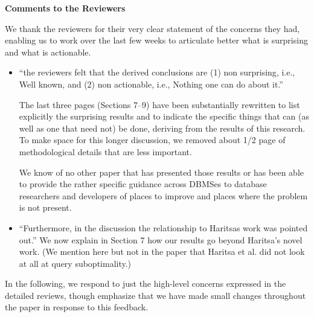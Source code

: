 \documentclass{sig-alternate}
\begin{document}
{\centering\Large\bf Comments to the Reviewers}

We thank the reviewers for their very clear statement of the concerns they
had, enabling us to work over the last few weeks to articulate better what is
surprising and what is actionable.

\vspace{2ex}

\begin{itemize}
\item ``the reviewers felt that the derived conclusions are (1) non
  surprising, i.e., Well known, and (2) non actionable, i.e., Nothing one
  can do about it.''

The last three pages (Sections 7--9) have been substantially rewritten to list explicitly the
surprising results and to indicate the specific things that can (as well as
one that need not) be done, deriving from the results of this research. To
make space for this longer discussion, we removed about 1/2 page of
methodological details that are less important.

We know of no other paper that has presented those results or has been able
to provide the rather specific guidance across DBMSes to database
researchers and developers of places to improve and places where the problem
is not present.

\item ``Furthermore, in the discussion the relationship to Haritsas work was
  pointed out.''
We now explain in Section 7 how our results go beyond Haritsa's novel work. (We
mention here but not in the paper that Haritsa et al. did not look at all at
query suboptimality.)
\end{itemize}

In the following, we respond to just the high-level concerns expressed in
the detailed reviews, though emphasize that we have made small changes
throughout the paper in response to this feedback.
\end{document}
